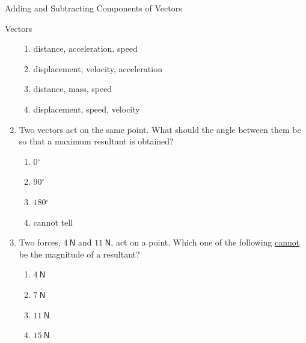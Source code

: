 \begin{exercises}{Adding and Subtracting Components of Vectors}
\begin{eocexercises}{Vectors}
\begin{enumerate}[noitemsep, label=\textbf{\arabic*}.]
\label{m38819*id197890}\begin{enumerate}[noitemsep, label=\textbf{\alph*}. ] 
            \label{m38819*uid103}\item distance, acceleration, speed
\label{m38819*uid104}\item displacement, velocity, acceleration
\label{m38819*uid105}\item distance, mass, speed
\label{m38819*uid106}\item displacement, speed, velocity
\end{enumerate}
                \label{m38819*uid107}\item Two vectors act on the same point. What should the angle between them be so that a maximum resultant is obtained?
\label{m38819*id197965}\begin{enumerate}[noitemsep, label=\textbf{\alph*}. ] 
            \label{m38819*uid108}\item $0{}^{\circ }$\label{m38819*uid109}\item $90{}^{\circ }$\label{m38819*uid110}\item $180{}^{\circ }$\label{m38819*uid111}\item cannot tell
\end{enumerate}
                \label{m38819*uid112}\item Two forces, $4 ~\mathsf{N}$ and $11 ~\mathsf{N}$, act on a point. Which one of the following \uline{cannot} be the magnitude of a resultant?
\label{m38819*id198082}\begin{enumerate}[noitemsep, label=\textbf{\alph*}. ] 
            \label{m38819*uid113}\item $4 ~\mathsf{N}$
\label{m38819*uid114}\item $7 ~\mathsf{N}$
\label{m38819*uid115}\item $11 ~\mathsf{N}$
\label{m38819*uid116}\item $15 ~\mathsf{N}$
\end{enumerate}


\end{enumerate}
\end{eocexercises}
\end{exercises}
